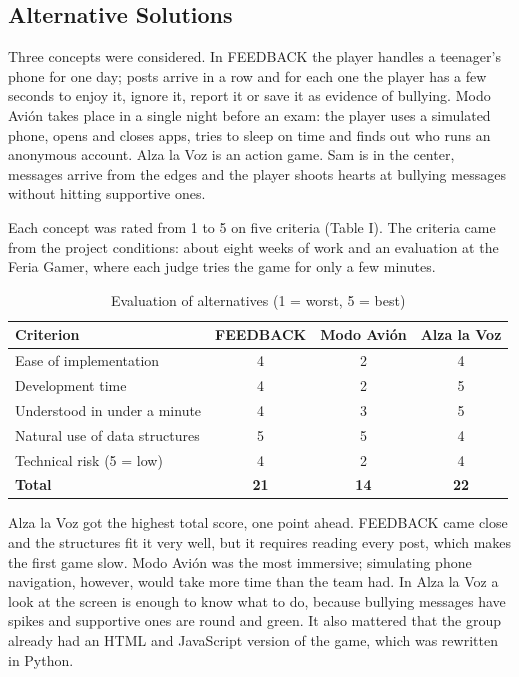 \documentclass[conference]{IEEEtran}
\begin{document}
\subsection{Alternative Solutions}

Three concepts were considered. In FEEDBACK the player handles a teenager's phone for one day; posts arrive in a row and for each one the player has a few seconds to enjoy it, ignore it, report it or save it as evidence of bullying. Modo Avión takes place in a single night before an exam: the player uses a simulated phone, opens and closes apps, tries to sleep on time and finds out who runs an anonymous account. Alza la Voz is an action game. Sam is in the center, messages arrive from the edges and the player shoots hearts at bullying messages without hitting supportive ones.

Each concept was rated from 1 to 5 on five criteria (Table I). The criteria came from the project conditions: about eight weeks of work and an evaluation at the Feria Gamer, where each judge tries the game for only a few minutes.

\begin{table}[!htbp]
\centering
\caption{Evaluation of alternatives (1 = worst, 5 = best)}
\footnotesize
\begin{tabularx}{\columnwidth}{|X|c|c|c|}
\hline
\textbf{Criterion} & \textbf{FEEDBACK} & \textbf{Modo Avión} & \textbf{Alza la Voz} \\ \hline
Ease of implementation & 4 & 2 & 4 \\ \hline
Development time & 4 & 2 & 5 \\ \hline
Understood in under a minute & 4 & 3 & 5 \\ \hline
Natural use of data structures & 5 & 5 & 4 \\ \hline
Technical risk (5 = low) & 4 & 2 & 4 \\ \hline
\textbf{Total} & \textbf{21} & \textbf{14} & \textbf{22} \\ \hline
\end{tabularx}
\end{table}

Alza la Voz got the highest total score, one point ahead. FEEDBACK came close and the structures fit it very well, but it requires reading every post, which makes the first game slow. Modo Avión was the most immersive; simulating phone navigation, however, would take more time than the team had. In Alza la Voz a look at the screen is enough to know what to do, because bullying messages have spikes and supportive ones are round and green. It also mattered that the group already had an HTML and JavaScript version of the game, which was rewritten in Python.
\end{document}
